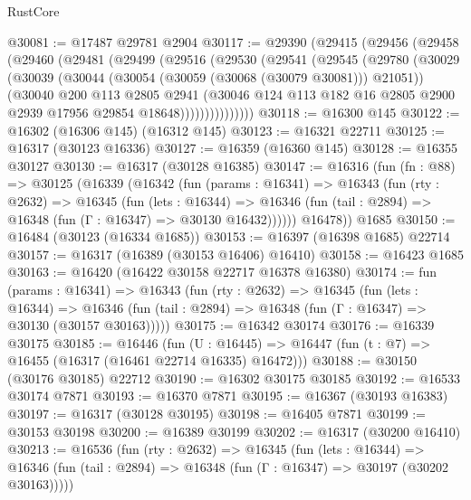 \begin{lexlean}{RustCore}
\begin{coremodule}
@30081 := @17487 @29781 @2904
@30117 := @29390
    (@29415
      (@29456
        (@29458
          (@29460
            (@29481
              (@29499
                (@29516
                  (@29530
                    (@29541
                      (@29545
                        (@29780
                          (@30029
                            (@30039
                              (@30044 (@30054 (@30059 (@30068 (@30079 @30081))) @21051))
                              (@30040
                                @200
                                @113
                                @2805
                                @2941
                                (@30046
                                  @124
                                  @113
                                  @182
                                  @16
                                  @2805
                                  @2900
                                  @2939
                                  @17956
                                  @29854
                                  @18648)))))))))))))))
@30118 := @16300 @145
@30122 := @16302 (@16306 @145) (@16312 @145)
@30123 := @16321 @22711
@30125 := @16317 (@30123 @16336)
@30127 := @16359 (@16360 @145)
@30128 := @16355 @30127
@30130 := @16317 (@30128 @16385)
@30147 := @16316
    (fun (fn : @88) =>
    @30125
      (@16339
        (@16342
          (fun (params : @16341) =>
          @16343
            (fun (rty : @2632) =>
            @16345
              (fun (lets : @16344) =>
              @16346 (fun (tail : @2894) => @16348 (fun (Γ : @16347) => @30130 @16432))))))
        @16478))
    @1685
@30150 := @16484 (@30123 (@16334 @1685))
@30153 := @16397 (@16398 @1685) @22714
@30157 := @16317 (@16389 (@30153 @16406) @16410)
@30158 := @16423 @1685
@30163 := @16420 (@16422 @30158 @22717 @16378 @16380)
@30174 := fun (params : @16341) =>
  @16343
    (fun (rty : @2632) =>
    @16345
      (fun (lets : @16344) =>
      @16346 (fun (tail : @2894) => @16348 (fun (Γ : @16347) => @30130 (@30157 @30163)))))
@30175 := @16342 @30174
@30176 := @16339 @30175
@30185 := @16446
    (fun (U : @16445) => @16447 (fun (t : @7) => @16455 (@16317 (@16461 @22714 @16335) @16472)))
@30188 := @30150 (@30176 @30185) @22712
@30190 := @16302 @30175 @30185
@30192 := @16533 @30174 @7871
@30193 := @16370 @7871
@30195 := @16367 (@30193 @16383)
@30197 := @16317 (@30128 @30195)
@30198 := @16405 @7871
@30199 := @30153 @30198
@30200 := @16389 @30199
@30202 := @16317 (@30200 @16410)
@30213 := @16536
    (fun (rty : @2632) =>
    @16345
      (fun (lets : @16344) =>
      @16346 (fun (tail : @2894) => @16348 (fun (Γ : @16347) => @30197 (@30202 @30163)))))

\end{coremodule}
\end{lexlean}
